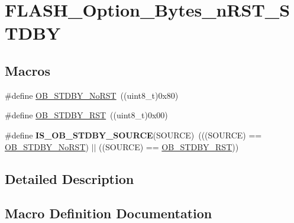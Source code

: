 \hypertarget{group___f_l_a_s_h___option___bytes__n_r_s_t___s_t_d_b_y}{}\section{F\+L\+A\+S\+H\+\_\+\+Option\+\_\+\+Bytes\+\_\+n\+R\+S\+T\+\_\+\+S\+T\+D\+B\+Y}
\label{group___f_l_a_s_h___option___bytes__n_r_s_t___s_t_d_b_y}
\subsection*{Macros}
\begin{DoxyCompactItemize}
\item 
\#define \hyperlink{group___f_l_a_s_h___option___bytes__n_r_s_t___s_t_d_b_y_ga9588443b20719498422aeb72b65de839}{O\+B\+\_\+\+S\+T\+D\+B\+Y\+\_\+\+No\+R\+S\+T}~((uint8\+\_\+t)0x80)
\item 
\#define \hyperlink{group___f_l_a_s_h___option___bytes__n_r_s_t___s_t_d_b_y_ga69451a6f69247528f58735c9c83499ce}{O\+B\+\_\+\+S\+T\+D\+B\+Y\+\_\+\+R\+S\+T}~((uint8\+\_\+t)0x00)
\item 
\hypertarget{group___f_l_a_s_h___option___bytes__n_r_s_t___s_t_d_b_y_ga8a05393df3a5e89551b4e2e1e8c5b884}{}\#define {\bfseries I\+S\+\_\+\+O\+B\+\_\+\+S\+T\+D\+B\+Y\+\_\+\+S\+O\+U\+R\+C\+E}(S\+O\+U\+R\+C\+E)~(((S\+O\+U\+R\+C\+E) == \hyperlink{group___f_l_a_s_h___option___bytes__n_r_s_t___s_t_d_b_y_ga9588443b20719498422aeb72b65de839}{O\+B\+\_\+\+S\+T\+D\+B\+Y\+\_\+\+No\+R\+S\+T}) $\vert$$\vert$ ((S\+O\+U\+R\+C\+E) == \hyperlink{group___f_l_a_s_h___option___bytes__n_r_s_t___s_t_d_b_y_ga69451a6f69247528f58735c9c83499ce}{O\+B\+\_\+\+S\+T\+D\+B\+Y\+\_\+\+R\+S\+T}))\label{group___f_l_a_s_h___option___bytes__n_r_s_t___s_t_d_b_y_ga8a05393df3a5e89551b4e2e1e8c5b884}

\end{DoxyCompactItemize}


\subsection{Detailed Description}


\subsection{Macro Definition Documentation}
\hypertarget{group___f_l_a_s_h___option___bytes__n_r_s_t___s_t_d_b_y_ga9588443b20719498422aeb72b65de839}{}
